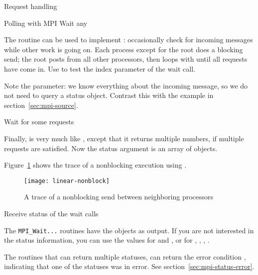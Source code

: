\begin{mplnote}{Request handling}
  \label{mpl:req_handle}
\end{mplnote}

 {Polling with MPI Wait any}

The  routine can be used to implement
: occasionally check for incoming messages while
other work is going on.
%
%
%
Each process except for the root does a blocking send; the root
posts  from all other processors, then loops
with  until all requests have come in. Use
 to test the index parameter of the wait
call.

Note the  parameter: we know everything
about the incoming message, so we do not need to query a status object.
Contrast this with the example in section~\ref{sec:mpi-source}.

 {Wait for some requests}

Finally,  is very much like ,
except that it returns multiple numbers, if multiple requests are
satisfied. Now the status argument is an array of 
objects.

Figure~\ref{fig:jump-nonblock} shows the trace of a nonblocking execution
using .
\begin{figure}[ht]
\texttt{[image: linear-nonblock]}
\caption{A trace of a nonblocking send between neighboring processors}
\label{fig:jump-nonblock}
\end{figure}

 {Receive status of the wait calls}
\label{sec:mpi-wait-status}

The \lstinline{MPI_Wait...} routines have the 
objects as output.
If you are not interested in
the status information, you can use the values
 for  and
,
or 
for , ,
, .

\begin{remark}
  The routines that can return multiple statuses,
  can return the error condition ,
  indicating that one of the statuses was in error.
  See section~\ref{sec:mpi-status-error}.
\end{remark}

